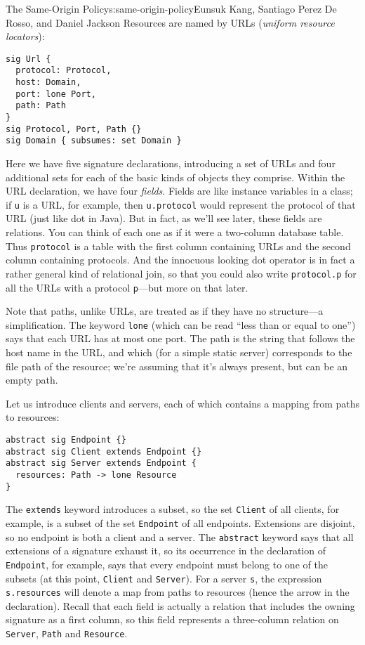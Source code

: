 \begin{aosachapter}{The Same-Origin Policy}{s:same-origin-policy}{Eunsuk Kang, Santiago Perez De Rosso, and Daniel Jackson}
Resources are named by URLs (\emph{uniform resource locators}):

\begin{verbatim}
sig Url {
  protocol: Protocol,
  host: Domain,
  port: lone Port,
  path: Path
}
sig Protocol, Port, Path {}
sig Domain { subsumes: set Domain }
\end{verbatim}

Here we have five signature declarations, introducing a set of URLs and
four additional sets for each of the basic kinds of objects they
comprise. Within the URL declaration, we have four \emph{fields}. Fields
are like instance variables in a class; if \texttt{u} is a URL, for
example, then \texttt{u.protocol} would represent the protocol of that
URL (just like dot in Java). But in fact, as we'll see later, these
fields are relations. You can think of each one as if it were a
two-column database table. Thus \texttt{protocol} is a table with the
first column containing URLs and the second column containing protocols.
And the innocuous looking dot operator is in fact a rather general kind
of relational join, so that you could also write \texttt{protocol.p} for
all the URLs with a protocol \texttt{p}---but more on that later.

Note that paths, unlike URLs, are treated as if they have no
structure---a simplification. The keyword \texttt{lone} (which can be
read ``less than or equal to one'') says that each URL has at most one
port. The path is the string that follows the host name in the URL, and
which (for a simple static server) corresponds to the file path of the
resource; we're assuming that it's always present, but can be an empty
path.

Let us introduce clients and servers, each of which contains a mapping
from paths to resources:

\begin{verbatim}
abstract sig Endpoint {}
abstract sig Client extends Endpoint {}
abstract sig Server extends Endpoint {
  resources: Path -> lone Resource
}
\end{verbatim}

The \texttt{extends} keyword introduces a subset, so the set
\texttt{Client} of all clients, for example, is a subset of the set
\texttt{Endpoint} of all endpoints. Extensions are disjoint, so no
endpoint is both a client and a server. The \texttt{abstract} keyword
says that all extensions of a signature exhaust it, so its occurrence in
the declaration of \texttt{Endpoint}, for example, says that every
endpoint must belong to one of the subsets (at this point,
\texttt{Client} and \texttt{Server}). For a server \texttt{s}, the
expression \texttt{s.resources} will denote a map from paths to
resources (hence the arrow in the declaration). Recall that each field
is actually a relation that includes the owning signature as a first
column, so this field represents a three-column relation on
\texttt{Server}, \texttt{Path} and \texttt{Resource}.


\end{aosachapter}
